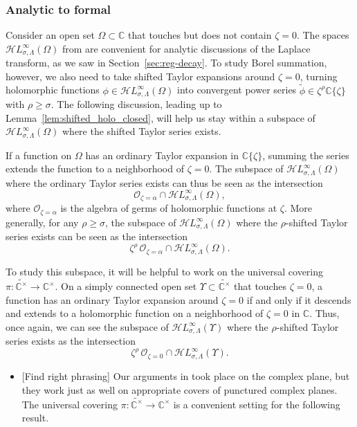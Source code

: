 \documentclass{article}
\newcommand{\singexp}[2]{\mathcal{H}L^\infty_{#1, #2}}
\newcommand{\maps}{\colon}
\newcommand{\C}{\mathbb{C}}
\newcommand{\series}[1]{\tilde{#1}}
\theoremstyle{definition}
\theoremstyle{plain}
\newenvironment{todo}{\color{Coral}}{\color{black}}
\newenvironment{brainstorm}{\color{BlueViolet}\begin{itemize}}{\end{itemize}\color{black}}
\begin{document}
\subsubsection{Analytic to formal}
%
Consider an open set $\Omega \subset \C$ that touches but does not contain $\zeta = 0$. The spaces $\singexp{\sigma}{\Lambda}(\Omega)$ from \cite{reg-sing-volterra} are convenient for analytic discussions of the Laplace transform, as we saw in Section~\ref{sec:reg-decay}. To study Borel summation, however, we also need to take shifted Taylor expansions around $\zeta = 0$, turning holomorphic functions $\phi \in \singexp{\sigma}{\Lambda}(\Omega)$ into convergent power series $\series{\phi} \in \zeta^\rho \C\{\zeta\}$ with $\rho \ge \sigma$. The following discussion, leading up to Lemma~\ref{lem:shifted_holo_closed}, will help us stay within a subspace of $\singexp{\sigma}{\Lambda}(\Omega)$ where the shifted Taylor series exists.

If a function on $\Omega$ has an ordinary Taylor expansion in $\C\{\zeta\}$, summing the series extends the function to a neighborhood of $\zeta = 0$. The subspace of $\singexp{\sigma}{\Lambda}(\Omega)$ where the ordinary Taylor series exists can thus be seen as the intersection
\[ \mathcal{O}_{\zeta = \alpha} \cap \singexp{\sigma}{\Lambda}(\Omega), \]
where $\mathcal{O}_{\zeta = \alpha}$ is the algebra of germs of holomorphic functions at $\zeta$. More generally, for any $\rho \ge \sigma$, the subspace of $\singexp{\sigma}{\Lambda}(\Omega)$ where the $\rho$-shifted Taylor series exists can be seen as the intersection
\[ \zeta^\rho\,\mathcal{O}_{\zeta = \alpha} \cap \singexp{\sigma}{\Lambda}(\Omega). \]

To study this subspace, it will be helpful to work on the universal covering $\pi \maps \widetilde{\C^\times} \to \C^\times$. On a simply connected open set $\Upsilon \subset \widetilde{\C^\times}$ that touches $\zeta = 0$, a function has an ordinary Taylor expansion around $\zeta = 0$ if and only if it descends and extends to a holomorphic function on a neighborhood of $\zeta = 0$ in $\C$. Thus, once again, we can see the subspace of $\singexp{\sigma}{\Lambda}(\Upsilon)$ where the $\rho$-shifted Taylor series exists as the intersection
\[ \zeta^\rho\,\mathcal{O}_{\zeta = 0} \cap \singexp{\sigma}{\Lambda}(\Upsilon). \]
\begin{brainstorm}
\item \begin{todo}[Find right phrasing]\end{todo} Our arguments in \cite{reg-sing-volterra} took place on the complex plane, but they work just as well on appropriate covers of punctured complex planes. The universal covering $\pi \maps \widetilde{\C^\times} \to \C^\times$ is a convenient setting for the following result.
\end{brainstorm}
\end{document}

